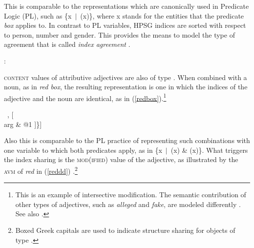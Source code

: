 \documentclass[output=paper
                ,modfonts
                ,nonflat
	        ,collection
	        ,collectionchapter
	        ,collectiontoclongg
 	        ,biblatex
                ,babelshorthands
                ,newtxmath
                ,draftmode
                ,colorlinks, citecolor=brown
]{./langsci/langscibook}
\begin{document}
\noindent
This is comparable to the representations which are canonically used in 
Predicate Logic (PL), such as \{x~$|$~(x)\}, where x stands for 
the entities that the predicate \emph{box} applies to. In contrast to 
PL variables, HPSG indices are sorted with respect to person, number 
and gender. This provides the means to model the type of agreement that 
is called \emph{index agreement} .

\begin{exe} 
\ex  {}: \begin{avm}
                     \end{avm} 
\end{exe} 

\textsc{content} values of attributive adjectives are also of type . 
When combined with a noun, as in \emph{red box}, the resulting representation 
is one in which the indices of the adjective and the noun are identical, as in 
(\ref{redbox}).\footnote{This is an example of intersective modification. 
The semantic contribution of other types of adjectives, such as  
\emph{alleged} and \emph{fake}, are modeled differently \citep[330--331]{ps2}. See also
.}   

\begin{exe} 
\ex\label{redbox} 
\begin{avm}
[\type{scope-object}     \\
 index & @1                \\
 restr & \{ [\type{red}    \\
             arg & @1 ] ~,
            [  \\
             arg & @1 ]\}]
\end{avm}
\end{exe}

\noindent
Also this is comparable to the PL practice of representing such 
combinations with one variable to which both predicates apply, as in 
\{x~$|$~(x) \& (x)\}. What triggers the index sharing is 
the \textsc{mod(ified)} value of the adjective, as illustrated by the \textsc{avm} of 
\emph{red} in (\ref{reddd}) \citep[55]{ps2}.\footnote{Boxed Greek capitals
are used to indicate structure sharing for objects of 
type  \citep[]{GS00}.} 
\end{document}
